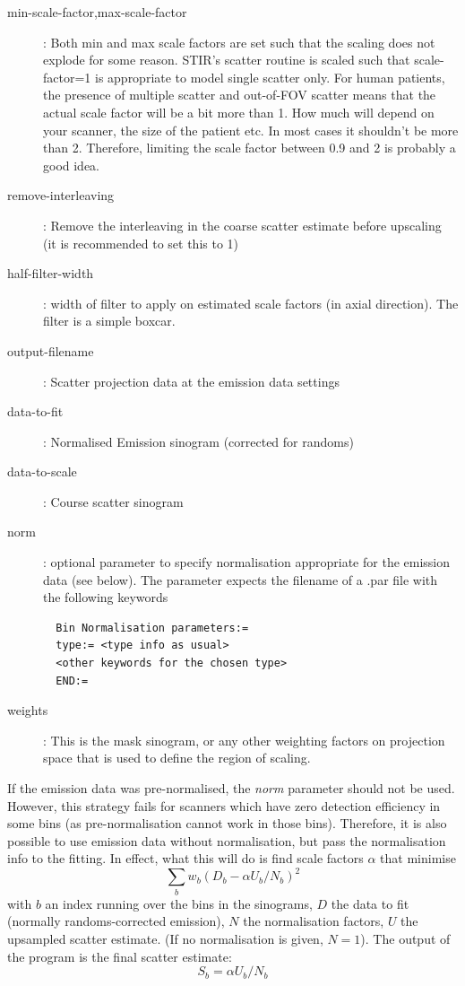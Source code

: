 \documentclass{article}
\begin{document}
\begin{description}
\item[min-scale-factor,max-scale-factor]: Both min and max scale factors are set such that the scaling does not explode for some reason. 
STIR's scatter routine is scaled such that scale-factor=1 is appropriate to model single scatter only. 
For human patients, the presence of multiple scatter and out-of-FOV scatter means that the actual 
scale factor will be a bit more than 1. How much will depend
on your scanner, the size of the patient etc. In most cases it shouldn't be
more than 2. Therefore, limiting the scale factor between 0.9 and 2 is probably a good idea.
\item[remove-interleaving]: Remove the interleaving in the coarse scatter estimate before upscaling (it is recommended to set this to 1)
\item[half-filter-width]: width of filter to apply on estimated scale factors (in axial direction). The filter is a simple boxcar.
\item[output-filename]: Scatter projection data at the emission data settings
\item[data-to-fit]: Normalised Emission sinogram (corrected for randoms) 
\item[data-to-scale]: Course scatter sinogram 
\item[norm]: optional parameter to specify normalisation appropriate for the emission data (see below).
  The parameter expects the filename of a .par file with the following keywords
  \begin{verbatim}
  Bin Normalisation parameters:=
  type:= <type info as usual>
  <other keywords for the chosen type>
  END:=
  \end{verbatim}
\item[weights]: This is the mask sinogram, or any other weighting factors on projection space that is used to define the region of scaling. 
\end{description}
If the emission data was pre-normalised, the \textit{norm} parameter should not be used. However, this strategy fails for
scanners which have zero detection efficiency in some bins (as pre-normalisation cannot work in those bins). Therefore,
it is also possible to use emission data without normalisation, but pass the normalisation info to the fitting. In effect, what this 
will do is find scale factors $\alpha$ that minimise
\[  \sum_b w_b (D_b - \alpha U_b/N_b)^2 \]
with $b$ an index running over the bins in the sinograms, $D$ the data to fit (normally randoms-corrected emission), $N$ the 
normalisation factors, $U$ the upsampled scatter estimate. (If no normalisation is given, $N=1$). The output of the program is the
final scatter estimate:
\[S_b =  \alpha U_b/N_b \]
\end{document}
